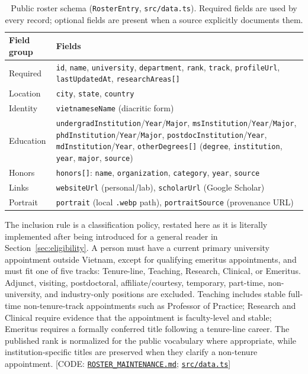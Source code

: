 \documentclass[11pt]{article}
\newcommand{\code}[1]{\texttt{\small #1}}
\newcommand{\ghrepo}{https://github.com/dynaroars/vietprofs}
\newcommand{\codelink}[1]{\href{\ghrepo/blob/main/#1}{\code{#1}}}
\newcommand{\codelinkd}[2]{\href{\ghrepo/blob/main/#1}{\code{#2}}}
\begin{document}
\begin{table}[t]
\centering
\caption{Public roster schema (\code{RosterEntry}, \code{src/data.ts}). Required fields are used by
every record; optional fields are present when a source explicitly documents them.}
\label{tab:schema}
\small
\begin{tabularx}{\linewidth}{@{}lX@{}}
\toprule
Field group & Fields \\
\midrule
Required & \code{id}, \code{name}, \code{university}, \code{department}, \code{rank}, \code{track},
\code{profileUrl}, \code{lastUpdatedAt}, \code{researchAreas[]} \\
Location & \code{city}, \code{state}, \code{country} \\
Identity & \code{vietnameseName} (diacritic form) \\
Education & \code{undergradInstitution}/\code{Year}/\code{Major},
\code{msInstitution}/\code{Year}/\code{Major},
\code{phdInstitution}/\code{Year}/\code{Major}, \code{postdocInstitution}/\code{Year},
\code{mdInstitution}/\code{Year}, \code{otherDegrees[]} (\code{degree}, \code{institution},
\code{year}, \code{major}, \code{source}) \\
Honors & \code{honors[]}: \code{name}, \code{organization}, \code{category}, \code{year},
\code{source} \\
Links & \code{websiteUrl} (personal/lab), \code{scholarUrl} (Google Scholar) \\
Portrait & \code{portrait} (local \code{.webp} path), \code{portraitSource} (provenance URL) \\
\bottomrule
\end{tabularx}
\end{table}

The inclusion rule is a classification policy, restated here as it is literally implemented after being introduced for a general reader in Section~\ref{sec:eligibility}.
A person must have a current primary university appointment outside Vietnam, except for qualifying emeritus appointments, and must fit one of five tracks: Tenure-line, Teaching, Research, Clinical, or Emeritus.
Adjunct, visiting, postdoctoral, affiliate/courtesy, temporary, part-time, non-university, and industry-only positions are excluded.
Teaching includes stable full-time non-tenure-track appointments such as Professor of Practice; Research and Clinical require evidence that the appointment is faculty-level and stable; Emeritus requires a formally conferred title following a tenure-line career.
The published rank is normalized for the public vocabulary where appropriate, while institution-specific titles are preserved when they clarify a non-tenure appointment.
[CODE: \codelinkd{ROSTER_MAINTENANCE.md}{ROSTER\_MAINTENANCE.md}; \codelink{src/data.ts}]
\end{document}
